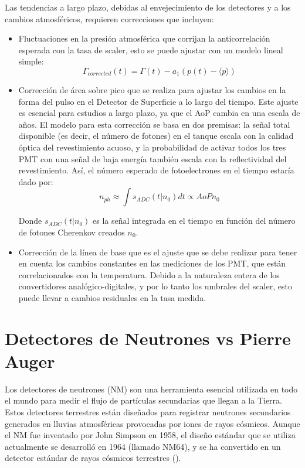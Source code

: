 Las tendencias a largo plazo, debidas al envejecimiento de los detectores y a los cambios atmosféricos, requieren correcciones que incluyen: 
\begin{itemize}
    \item Fluctuaciones en la presión atmosférica que corrijan la anticorrelación esperada con la tasa de scaler, esto se puede ajustar con un modelo lineal simple:
\begin{equation}
    \Gamma_{corrected}(t)=\Gamma(t)-a_{1}(p(t)-\langle p\rangle)
\end{equation}
    \item Corrección de área sobre pico que se realiza para ajustar los cambios en la forma del pulso en el Detector de Superficie a lo largo del tiempo. Este ajuste es esencial para estudios a largo plazo, ya que el AoP cambia en una escala de años. El modelo para esta corrección se basa en dos premisas: la señal total disponible (es decir, el número de fotones) en el tanque escala con la calidad óptica del revestimiento acuoso, y la probabilidad de activar todos los tres PMT con una señal de baja energía también escala con la reflectividad del revestimiento. Así, el número esperado de fotoelectrones en el tiempo estaría dado por:
\begin{equation}
    n_{ph}\approx \int s_{ADC}(t|n_{0})  dt  \propto AoP n_{0}
\end{equation}

Donde $s_{ADC}(t|n_{0})$ es la señal integrada en el tiempo en función del número de fotones Cherenkov creados $n_{0}$. 

    \item  Corrección de la línea de base que es el ajuste que se debe realizar para tener en cuenta los cambios constantes en las mediciones de los PMT, que están correlacionados con la temperatura. Debido a la naturaleza entera de los convertidores analógico-digitales, y por lo tanto los umbrales del scaler, esto puede llevar a cambios residuales en la tasa medida.
\end{itemize} 

\section{Detectores de Neutrones vs Pierre Auger}

Los detectores de neutrones (NM) son una herramienta esencial utilizada en todo el mundo para medir el flujo de partículas secundarias que llegan a la Tierra. Estos detectores terrestres están diseñados para registrar neutrones secundarios generados en lluvias atmosféricas provocadas por iones de rayos cósmicos. Aunque el NM fue inventado por John Simpson en 1958, el diseño estándar que se utiliza actualmente se desarrolló en 1964 (llamado NM64), y se ha convertido en un detector estándar de rayos cósmicos terrestres (\cite{eleana_2017}).

